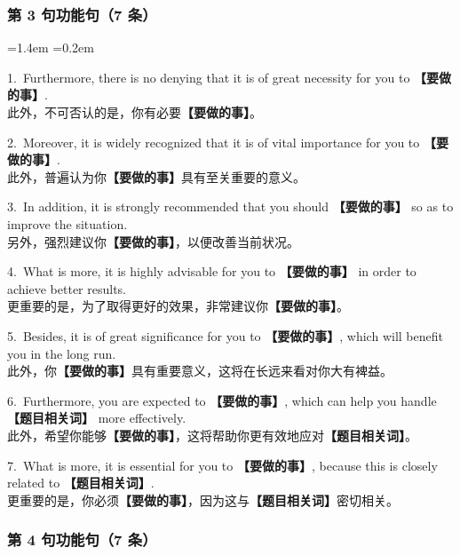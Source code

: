 \documentclass[11pt,a4paper]{ctexart}
\newcommand{\fillin}[1]{{\bfseries【#1】}}
\newenvironment{eg}{%
  \par\addvspace{4pt}%
  \begin{list}{}{\leftmargin=1.4em \rightmargin=0.2em \listparindent=0pt
    \itemindent=0pt \topsep=0pt \parsep=2pt \itemsep=2pt \partopsep=0pt}%
  \item\relax
}{%
  \end{list}\addvspace{5pt}%
}
\begin{document}
\subsubsection{第 3 句功能句（7 条）}

\begin{eg}
1.\ Furthermore, there is no denying that it is of great necessity for you to \fillin{要做的事}.\\
此外，不可否认的是，你有必要\fillin{要做的事}。

2.\ Moreover, it is widely recognized that it is of vital importance for you to \fillin{要做的事}.\\
此外，普遍认为你\fillin{要做的事}具有至关重要的意义。

3.\ In addition, it is strongly recommended that you should \fillin{要做的事} so as to improve the situation.\\
另外，强烈建议你\fillin{要做的事}，以便改善当前状况。

4.\ What is more, it is highly advisable for you to \fillin{要做的事} in order to achieve better results.\\
更重要的是，为了取得更好的效果，非常建议你\fillin{要做的事}。

5.\ Besides, it is of great significance for you to \fillin{要做的事}, which will benefit you in the long run.\\
此外，你\fillin{要做的事}具有重要意义，这将在长远来看对你大有裨益。

6.\ Furthermore, you are expected to \fillin{要做的事}, which can help you handle \fillin{题目相关词} more effectively.\\
此外，希望你能够\fillin{要做的事}，这将帮助你更有效地应对\fillin{题目相关词}。

7.\ What is more, it is essential for you to \fillin{要做的事}, because this is closely related to \fillin{题目相关词}.\\
更重要的是，你必须\fillin{要做的事}，因为这与\fillin{题目相关词}密切相关。
\end{eg}

\subsubsection{第 4 句功能句（7 条）}
\end{document}
